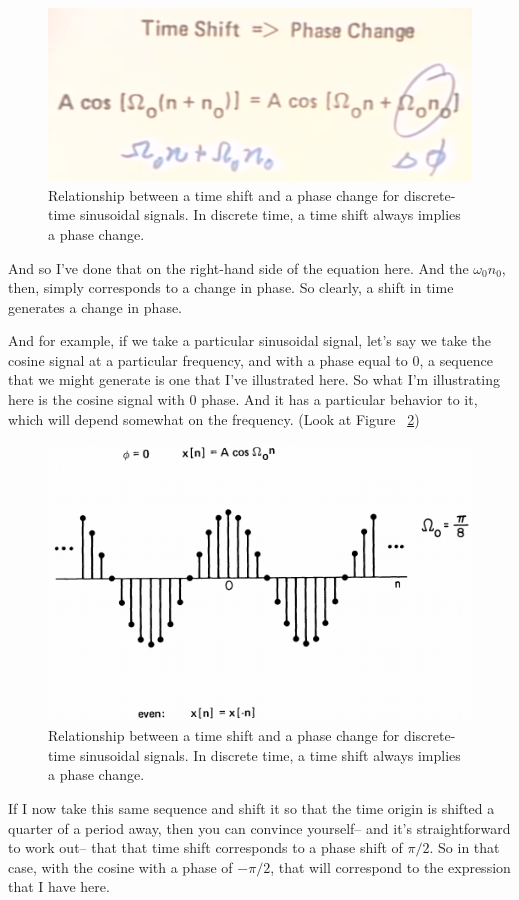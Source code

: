 \documentclass[fleqn,10pt]{olplainarticle}
\theoremstyle{definition}
\theoremstyle{remark}
\begin{document}
\begin{figure}[ht]
	\centering
	\includegraphics[width=0.4\linewidth]{images/signals_06.png}
	\caption{Relationship between a time shift and a phase change for discrete-time sinusoidal signals. In discrete time, a time shift always implies a phase change.}
	\label{fig:signals_06}
\end{figure}

And so I've done that on the right-hand side of the equation here. And the $\omega_0 n_0$, then, simply corresponds to a change in phase. So clearly, a shift in time generates a change in phase.

And for example, if we take a particular sinusoidal signal, let's say we take the cosine signal at a particular frequency, and with a phase equal to 0, a sequence that we might generate is one that I've illustrated here. So what I'm illustrating here is the cosine signal with 0 phase. And it has a particular behavior to it, which will depend somewhat on the frequency. (Look at Figure ~\ref{fig:signals_07})

\begin{figure}[ht]
	\centering
	\includegraphics[width=0.5\linewidth]{images/signals_07.png}
	\caption{Relationship between a time shift and a phase change for discrete-time sinusoidal signals. In discrete time, a time shift always implies a phase change.}
	\label{fig:signals_07}
\end{figure}

If I now take this same sequence and shift it so that the time origin is shifted a quarter of a period away, then you can convince yourself-- and it's straightforward to work out-- that that time shift corresponds to a phase shift of $\pi / 2$. So in that case, with the cosine with a phase of $-\pi / 2$, that will correspond to the expression that I have here.
\end{document}
